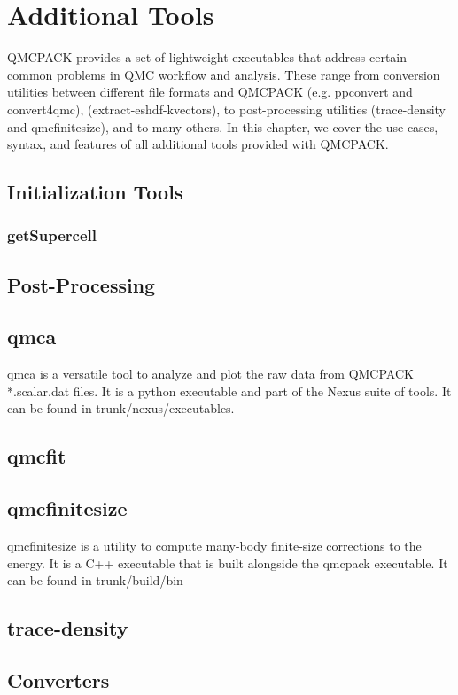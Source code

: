 \chapter{Additional Tools}
\label{chap:additional_tools}
QMCPACK provides a set of lightweight executables that address certain
common problems in QMC workflow and analysis.  These range from conversion utilities between 
different file formats and QMCPACK (e.g. ppconvert and convert4qmc),  
(extract-eshdf-kvectors), to post-processing utilities (trace-density and qmcfinitesize), and to many others.  In this chapter, we cover the use cases, syntax, and features of all additional tools provided with QMCPACK.  

\section{Initialization Tools}
  \subsection{getSupercell}

\section{Post-Processing}
  \section{qmca}
    qmca is a versatile tool to analyze and plot the raw data from QMCPACK *.scalar.dat files.
    It is a python executable and part of the Nexus suite of tools.  It can be found in 
    trunk/nexus/executables. 
  \section{qmcfit}
  \section{qmcfinitesize}
    qmcfinitesize is a utility to compute many-body finite-size corrections to the energy.  It
    is a C++ executable that is built alongside the qmcpack executable.  It can be found in 
    trunk/build/bin
  \section{trace-density}

\section{Converters} 
